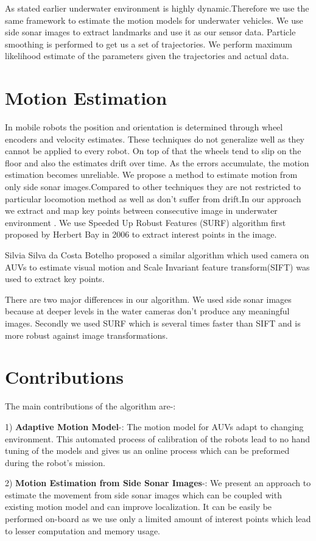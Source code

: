 \documentclass[12pt]{dalcsthesis}
\begin{document}
As stated earlier underwater environment is highly dynamic.Therefore we use the same framework to estimate the motion models for underwater vehicles. We use side sonar images to extract landmarks and use it as our sensor data. Particle smoothing is performed to get us a set of trajectories. We perform maximum likelihood estimate of the parameters given the trajectories and actual data. 



\section{Motion Estimation}
In mobile robots the position and orientation is determined through wheel encoders and velocity estimates. These techniques do not generalize well as they cannot be applied to every robot. On top of that the wheels tend to slip on the floor and also the estimates drift over time. As the errors accumulate, the motion estimation becomes unreliable. 
We propose a method to estimate motion from only side sonar images.Compared to other techniques they are not restricted to particular locomotion method as well as don't suffer from drift.In our approach we extract and map key points between consecutive image in underwater environment . We use Speeded Up Robust Features (SURF) algorithm first proposed by Herbert Bay in 2006 to extract interest points in the image. 

Silvia Silva da Costa Botelho proposed a similar algorithm which used camera on AUVs to estimate visual motion and Scale Invariant feature transform(SIFT) was used to extract key points. 

There are two major differences in our algorithm. We used side sonar images because at deeper levels in the water cameras don't produce any meaningful images. Secondly we used SURF which is several times faster than SIFT and is more robust against image transformations. 

\section{Contributions}
The main contributions of the algorithm are-:

1) \textbf{Adaptive Motion Model}-: The motion model for AUVs adapt to changing environment. This automated process of calibration of the robots lead to no hand tuning of the models and gives us an online process which can be preformed during the robot's mission.  

2) \textbf{Motion Estimation from Side Sonar Images}-: We present an approach to estimate the movement from side sonar images which can be coupled with existing motion model and can improve localization. It can be easily be performed on-board as we use only a limited amount of interest points which lead to lesser computation and memory usage. 
\end{document}
